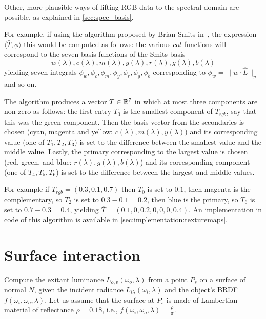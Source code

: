 Other, more plausible ways of lifting \gls{RGB} data to the spectral domain
are possible, as explained in \cref{sec:spec_basis}.

For example, if using the algorithm proposed by Brian Smits in~\cite{smits99},
the expression $\langle \bar T, \phi \rangle$ this would be computed as follows:
the various $col$ functions will correspond to the seven basis functions of the
Smits basis 
\begin{equation*}
w(λ), c(λ), m(λ), y(λ), r(λ), g(λ), b(λ) 
\end{equation*}
yielding seven integrals
$\phi_w, \phi_c, \phi_m, \phi_y, \phi_r, \phi_g, \phi_b$ corresponding to
$\phi_w =  \|w\cdot\hat{L}\|_{\bar y}$ and so on.

The algorithm produces a vector $\bar T \in \mathbb{R}^7$ in which at most three
components are non-zero as follows: the first entry $T_0$ is the smallest component
of $\overline{T_{rgb}}$, say that this was the green component. Then the basis
vector from the secondaries is chosen (cyan, magenta and yellow: $c(\lambda), m(\lambda), y(\lambda)$)
and its corresponding value (one of $T_1, T_2, T_3$) is set to the difference
between the smallest value and the middle value. Lastly, the primary corresponding
to the largest value is chosen (red, green, and blue: $r(\lambda), g(\lambda), b(\lambda)$)
and its corresponding component (one of $T_4, T_5, T_6$) is set to the difference
between the largest and middle values.

For example if $\overline{T_{rgb}} = (0.3, 0.1, 0.7)$ then $T_0$ is set to $0.1$,
then magenta is the complementary, so $T_2$ is set to $0.3-0.1 = 0.2$, then
blue is the primary, so $T_6$ is set to $0.7 - 0.3 = 0.4$, yielding
$\overline{T} = (0.1, 0, 0.2, 0, 0, 0, 0.4)$. An implementation in code of
this algorithm is available in \cref{sec:implementation:texturemaps}.

\section{Surface interaction}

Compute the exitant luminance $L_{o,v}(\omega_o, \lambda)$ from a point
$P_s$ on a surface of normal $N$, given the incident radiance
$L_{i\lambda}(\omega_i, \lambda)$ and the object’s BRDF $f(\omega_i, \omega_o, \lambda)$.
Let us assume that the surface at $P_s$ is made of Lambertian material of reflectance $\rho=0.18$, i.e., $f(\omega_i, \omega_o, \lambda) = \frac \rho \pi$. 

